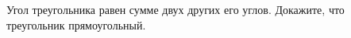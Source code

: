 \begin{ex}
	\begin{condition}
		Угол треугольника равен сумме двух других его углов. Докажите, что треугольник прямоугольный.
	\end{condition}
\end{ex}